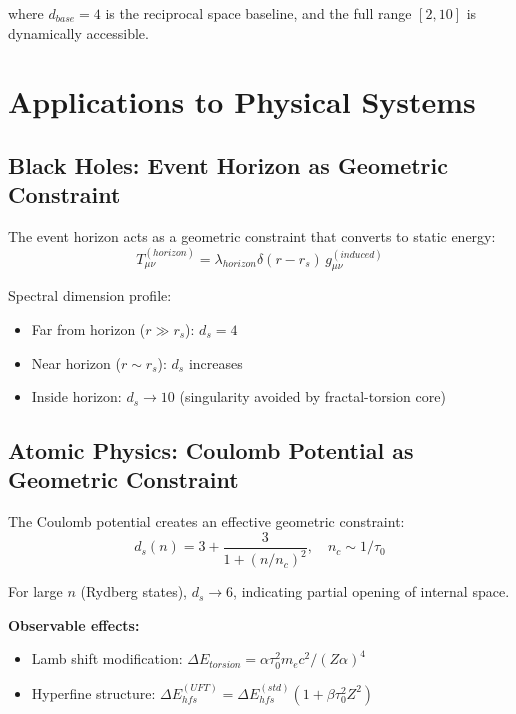 \documentclass[12pt,a4paper]{article}
\begin{document}
where $d_{base} = 4$ is the reciprocal space baseline, and the full range $[2, 10]$ is dynamically accessible.

\section{Applications to Physical Systems}
\label{app:applications}

\subsection{Black Holes: Event Horizon as Geometric Constraint}

The event horizon acts as a geometric constraint that converts to static energy:
\begin{equation}
    T_{\mu\nu}^{(horizon)} = \lambda_{horizon} \delta(r-r_s) \, g_{\mu\nu}^{(induced)}
\end{equation}

Spectral dimension profile:
\begin{itemize}
    \item Far from horizon ($r \gg r_s$): $d_s = 4$
    \item Near horizon ($r \sim r_s$): $d_s$ increases
    \item Inside horizon: $d_s \to 10$ (singularity avoided by fractal-torsion core)
\end{itemize}

\subsection{Atomic Physics: Coulomb Potential as Geometric Constraint}

The Coulomb potential creates an effective geometric constraint:
\begin{equation}
    d_s(n) = 3 + \frac{3}{1+(n/n_c)^2}, \quad n_c \sim 1/\tau_0
\end{equation}

For large $n$ (Rydberg states), $d_s \to 6$, indicating partial opening of internal space.

\textbf{Observable effects:}
\begin{itemize}
    \item Lamb shift modification: $\Delta E_{torsion} = \alpha \tau_0^2 m_e c^2/(Z\alpha)^4$
    \item Hyperfine structure: $\Delta E_{hfs}^{(UFT)} = \Delta E_{hfs}^{(std)}(1 + \beta \tau_0^2 Z^2)$
\end{itemize}
\end{document}
